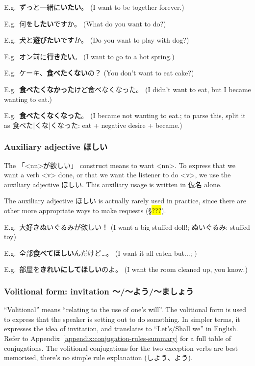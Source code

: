 \documentclass[../nihongo-gakushuu-kyouzai.tex]{subfiles}
\begin{document}
E.g.\ ずっと一緒に\textbf{いたい}。 (I want to be together forever.)

E.g.\ 何を\textbf{したい}ですか。 (What do you want to do?)

E.g.\ 犬と\textbf{遊びたい}ですか。 (Do you want to play with dog?)

E.g.\ オン前に\textbf{行きたい}。 (I want to go to a hot spring.)

E.g.\ ケーキ、\textbf{食べたくない}の？ (You don't want to eat cake?)

E.g.\ \textbf{食べたくなかった}けど食べなくなった。 (I didn't want to eat, but I became wanting to eat.)

E.g.\ \textbf{食べたくなくなった}。 (I became not wanting to eat.; to parse this, split it as 食べた|くな|くなった: eat + negative desire + became.)

\subsubsection{Auxiliary adjective ほしい} \label{sec:auxiliary-adjective-hoshii}
The 「<nn>が欲しい」 construct means to want <nn>. To express that we want a verb <v> done, or that we want the listener to do <v>, we use the auxiliary adjective ほしい. This auxiliary usage is written in 仮名 alone.

The auxiliary adjective ほしい is actually rarely used in practice, since there are other more appropriate ways to make requests (\S\hl{???}).

E.g.\ 大好きぬいぐるみが欲しい！ (I want a big stuffed doll!; ぬいぐるみ: stuffed toy)

E.g.\ 全部\textbf{食べてほしい}んだけど\dots。 (I want it all eaten but...; )

E.g.\ 部屋を\textbf{きれいにしてほしい}のよ。 (I want the room cleaned up, you know.)


\subsubsection{Volitional form: invitation 〜/〜よう/〜ましょう} \label{sec:volitional-form}
``Volitional'' means ``relating to the use of one's will''. The volitional form is used to express that the speaker is setting out to do something. In simpler terms, it expresses the idea of invitation, and translates to ``Let's/Shall we'' in English. Refer to Appendix~\ref{appendix:conjugation-rules-summary} for a full table of conjugations. The volitional conjugations for the two exception verbs are best memorised, there's no simple rule explanation (しよう、よう).
\end{document}
